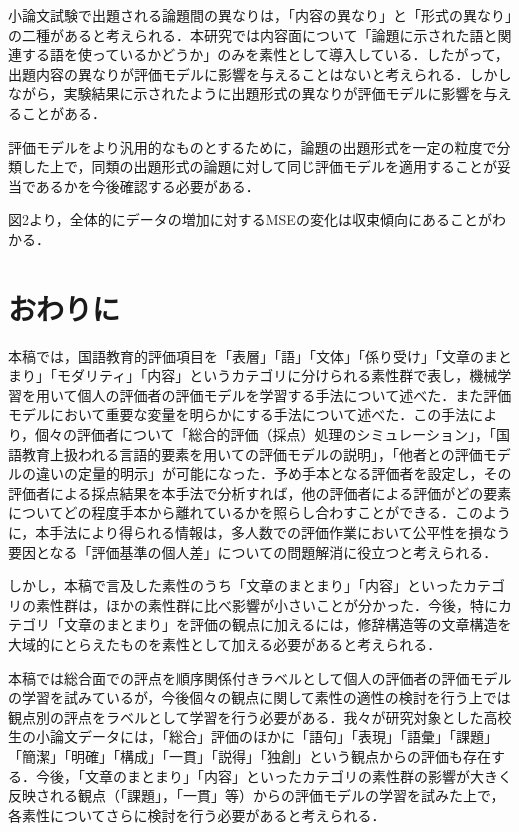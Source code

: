 \documentclass[japanese]{jnlp_1.5}
\newenvironment{iindent1zw}{}{}
\begin{document}
\begin{iindent1zw}
小論文試験で出題される論題間の異なりは，「内容の異なり」と「形式の異なり」の二種があると考えられる．本研究では内容面について「論題に示された語と関連する語を使っているかどうか」のみを素性として導入している．したがって，出題内容の異なりが評価モデルに影響を与えることはないと考えられる．しかしながら，実験結果に示されたように出題形式の異なりが評価モデルに影響を与えることがある．

評価モデルをより汎用的なものとするために，論題の出題形式を一定の粒度で分類した上で，同類の出題形式の論題に対して同じ評価モデルを適用することが妥当であるかを今後確認する必要がある．
\end{iindent1zw}

\noindent {}

\begin{iindent1zw}
図2より，全体的にデータの増加に対するMSEの変化は収束傾向にあることがわかる．
\end{iindent1zw}



\section{おわりに}

本稿では，国語教育的評価項目を「表層」「語」「文体」「係り受け」「文章のまとまり」「モダリティ」「内容」というカテゴリに分けられる素性群で表し，機械学習を用いて個人の評価者の評価モデルを学習する手法について述べた．また評価モデルにおいて重要な変量を明らかにする手法について述べた．この手法により，個々の評価者について「総合的評価（採点）処理のシミュレーション」，「国語教育上扱われる言語的要素を用いての評価モデルの説明」，「他者との評価モデルの違いの定量的明示」が可能になった．予め手本となる評価者を設定し，その評価者による採点結果を本手法で分析すれば，他の評価者による評価がどの要素についてどの程度手本から離れているかを照らし合わすことができる．このように，本手法により得られる情報は，多人数での評価作業において公平性を損なう要因となる「評価基準の個人差」についての問題解消に役立つと考えられる．

しかし，本稿で言及した素性のうち「文章のまとまり」「内容」といったカテゴリの素性群は，ほかの素性群に比べ影響が小さいことが分かった．今後，特にカテゴリ「文章のまとまり」を評価の観点に加えるには，修辞構造等の文章構造を大域的にとらえたものを素性として加える必要があると考えられる．

本稿では総合面での評点を順序関係付きラベルとして個人の評価者の評価モデルの学習を試みているが，今後個々の観点に関して素性の適性の検討を行う上では観点別の評点をラベルとして学習を行う必要がある．我々が研究対象とした高校生の小論文データには，「総合」評価のほかに「語句」「表現」「語彙」「課題」「簡潔」「明確」「構成」「一貫」「説得」「独創」という観点からの評価も存在する．今後，「文章のまとまり」「内容」といったカテゴリの素性群の影響が大きく反映される観点（「課題」，「一貫」等）からの評価モデルの学習を試みた上で，各素性についてさらに検討を行う必要があると考えられる．
\end{document}
